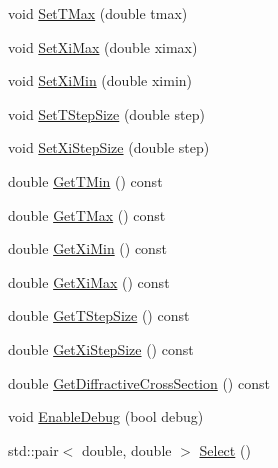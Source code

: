 \begin{DoxyCompactItemize}
void \hyperlink{classParticleTracking_1_1ppDiffractiveScatter_a31b1bc459e301f2a4ae78f2caa803ec0}{Set\+T\+Max} (double tmax)
\item 
void \hyperlink{classParticleTracking_1_1ppDiffractiveScatter_acfd8385c3ee1f3e710a1c7ef15183039}{Set\+Xi\+Max} (double ximax)
\item 
void \hyperlink{classParticleTracking_1_1ppDiffractiveScatter_a8138fee1bfa1b108e2862a1f56024fa8}{Set\+Xi\+Min} (double ximin)
\item 
void \hyperlink{classParticleTracking_1_1ppDiffractiveScatter_a19f9d33319193a4dab8e50c48fd72d7a}{Set\+T\+Step\+Size} (double step)
\item 
void \hyperlink{classParticleTracking_1_1ppDiffractiveScatter_af1e7bef526bd62823d1cdc5e9346ac1f}{Set\+Xi\+Step\+Size} (double step)
\item 
double \hyperlink{classParticleTracking_1_1ppDiffractiveScatter_a8d902c13f5e4ad344a70838dbf88549f}{Get\+T\+Min} () const
\item 
double \hyperlink{classParticleTracking_1_1ppDiffractiveScatter_a59b5664ec798af2b1cc682240c477523}{Get\+T\+Max} () const
\item 
double \hyperlink{classParticleTracking_1_1ppDiffractiveScatter_a3f2bea86667f9eef5afad654eef91d21}{Get\+Xi\+Min} () const
\item 
double \hyperlink{classParticleTracking_1_1ppDiffractiveScatter_a0f05fe9418d9081c40fb89ae0274fc56}{Get\+Xi\+Max} () const
\item 
double \hyperlink{classParticleTracking_1_1ppDiffractiveScatter_a552947ba20fbbf8e93cbc48b3e9e6a5f}{Get\+T\+Step\+Size} () const
\item 
double \hyperlink{classParticleTracking_1_1ppDiffractiveScatter_a7b00f2c992d0e353c85c6ee4b0e6cbda}{Get\+Xi\+Step\+Size} () const
\item 
double \hyperlink{classParticleTracking_1_1ppDiffractiveScatter_a89425dbbdcf14f06ffe2bf50cfde7072}{Get\+Diffractive\+Cross\+Section} () const
\item 
void \hyperlink{classParticleTracking_1_1ppDiffractiveScatter_a206970eeedffc495ff7558fd5078b2a0}{Enable\+Debug} (bool debug)
\item 
std\+::pair$<$ double, double $>$ \hyperlink{classParticleTracking_1_1ppDiffractiveScatter_a813e2437d113d3db8994e3301d07855e}{Select} ()
\end{DoxyCompactItemize}


